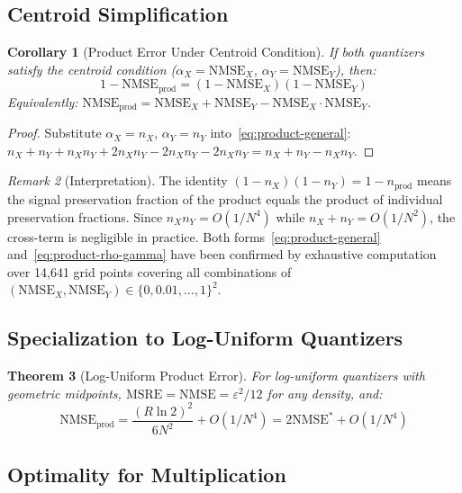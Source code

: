 \documentclass[11pt,letterpaper]{article}
\newtheorem{theorem}{Theorem}[section]
\newtheorem{corollary}[theorem]{Corollary}
\theoremstyle{definition}
\theoremstyle{remark}
\newtheorem{remark}[theorem]{Remark}
\newcommand{\NMSE}{\mathrm{NMSE}}
\newcommand{\MSRE}{\mathrm{MSRE}}
\begin{document}
\subsection{Centroid Simplification}

\begin{corollary}[Product Error Under Centroid Condition]
\label{cor:product-centroid}
If both quantizers satisfy the centroid condition
($\alpha_X = \NMSE_X$, $\alpha_Y = \NMSE_Y$), then:
\begin{equation}
  \boxed{1 - \NMSE_{\mathrm{prod}} = (1 - \NMSE_X)(1 - \NMSE_Y)}
  \label{eq:product-preservation}
\end{equation}
Equivalently:
$\NMSE_{\mathrm{prod}} = \NMSE_X + \NMSE_Y - \NMSE_X \cdot \NMSE_Y$.
\end{corollary}

\begin{proof}
Substitute $\alpha_X = n_X$, $\alpha_Y = n_Y$
into~\eqref{eq:product-general}:
$n_X + n_Y + n_X n_Y + 2n_X n_Y - 2n_X n_Y - 2n_X n_Y
= n_X + n_Y - n_X n_Y$.
\end{proof}

\begin{remark}[Interpretation]
The identity $(1 - n_X)(1 - n_Y) = 1 - n_{\mathrm{prod}}$ means the signal
preservation fraction of the product equals the product of individual
preservation fractions.
Since $n_X n_Y = O(1/N^4)$ while $n_X + n_Y = O(1/N^2)$, the cross-term is
negligible in practice.
Both forms~\eqref{eq:product-general} and~\eqref{eq:product-rho-gamma} have
been confirmed by exhaustive computation over 14{,}641 grid points covering all
combinations of $(\NMSE_X, \NMSE_Y) \in \{0, 0.01, \ldots, 1\}^2$.
\end{remark}

\subsection{Specialization to Log-Uniform Quantizers}

\begin{theorem}[Log-Uniform Product Error]
\label{thm:product-loguniform}
For log-uniform quantizers with geometric midpoints,
$\MSRE = \NMSE = \varepsilon^2/12$ for any density, and:
\begin{equation}
  \NMSE_{\mathrm{prod}} = \frac{(R\ln 2)^2}{6N^2} + O(1/N^4)
  = 2\NMSE^* + O(1/N^4)
\end{equation}
\end{theorem}

\subsection{Optimality for Multiplication}
\end{document}
